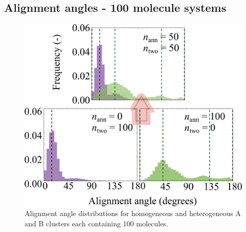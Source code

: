 \subsection{Alignment angles - 100 molecule systems}
%
\begin{figure}[!tbh]
\centering
\includegraphics[width=0.5\linewidth]{Figures/alignment_angle_hetero_SI_draft.png}
\caption{Alignment angle distributions for homogeneous and heterogeneous A and B clusters each containing 100 molecules.}
\label{figSI:alignmentangles_100}
\end{figure}
%

